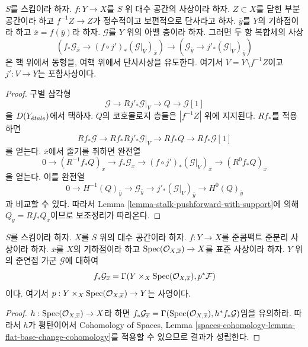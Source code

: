 \begin{lemma}
\label{lemma-stalk-formal-glueing}
$S$를 스킴이라 하자. $f : Y \to X$를 $S$ 위 대수 공간의 사상이라 하자.
$Z \subset X$를 닫힌 부분공간이라 하고 $f^{-1}Z \to Z$가 정수적이고
보편적으로 단사라고 하자. $\overline{y}$를 $Y$의 기하점이라 하고
$\overline{x} = f(\overline{y})$라 하자. $\mathcal{G}$를 $Y$ 위의
아벨 층이라 하자. 그러면 두 항 복합체의 사상
$$
\left(f_*\mathcal{G}_{\overline{x}} \to
(f \circ j')_*(\mathcal{G}|_V)_{\overline{x}}\right)
\longrightarrow
\left(\mathcal{G}_{\overline{y}} \to j'_*(\mathcal{G}|_V)_{\overline{y}}\right)
$$
은 핵 위에서 동형을, 여핵 위에서 단사사상을 유도한다. 여기서
$V = Y \setminus f^{-1}Z$이고 $j' : V \to Y$는 포함사상이다.
\end{lemma}

\begin{proof}
구별 삼각형
$$
\mathcal{G} \to Rj'_*\mathcal{G}|_V \to Q \to \mathcal{G}[1]
$$
을 $D(Y_{\acute{e}tale})$에서 택하자. $Q$의 코호몰로지 층들은
$|f^{-1}Z|$ 위에 지지된다. $Rf_*$를 적용하면
$$
Rf_*\mathcal{G} \to Rf_*Rj'_*\mathcal{G}|_V \to Rf_*Q
\to Rf_*\mathcal{G}[1]
$$
를 얻는다. $\overline{x}$에서 줄기를 취하면 완전열
$$
0 \to
(R^{-1}f_*Q)_{\overline{x}} \to
f_*\mathcal{G}_{\overline{x}} \to
(f \circ j')_*(\mathcal{G}|_V)_{\overline{x}} \to
(R^0f_*Q)_{\overline{x}}
$$
을 얻는다. 이를 완전열
$$
0 \to
H^{-1}(Q)_{\overline{y}} \to
\mathcal{G}_{\overline{y}} \to
j'_*(\mathcal{G}|_V)_{\overline{y}} \to
H^0(Q)_{\overline{y}}
$$
과 비교할 수 있다. 따라서 Lemma
\ref{lemma-stalk-pushforward-with-support}에 의해
$Q_{\overline{y}} = Rf_*Q_{\overline{x}}$이므로 보조정리가 따라온다.
\end{proof}

\begin{lemma}
\label{lemma-stalk-of-pushforward}
$S$를 스킴이라 하자. $X$를 $S$ 위의 대수 공간이라 하자.
$f : Y \to X$를 준콤팩트 준분리 사상이라 하자.
$\overline{x}$를 $X$의 기하점이라 하고
$\mathop{\mathrm{Spec}}(\mathcal{O}_{X, \overline{x}}) \to X$를 표준 사상이라 하자.
$Y$ 위의 준연접 가군 $\mathcal{G}$에 대하여
$$
f_*\mathcal{G}_{\overline{x}} =
\Gamma(Y \times_X \mathop{\mathrm{Spec}}(\mathcal{O}_{X, \overline{x}}), p^*\mathcal{F})
$$
이다. 여기서 $p : Y \times_X \mathop{\mathrm{Spec}}(\mathcal{O}_{X, \overline{x}}) \to Y$는
사영이다.
\end{lemma}

\begin{proof}
$h : \mathop{\mathrm{Spec}}(\mathcal{O}_{X, \overline{x}}) \to X$라 하면
$f_*\mathcal{G}_{\overline{x}} =
\Gamma(\mathop{\mathrm{Spec}}(\mathcal{O}_{X, \overline{x}}), h^*f_*\mathcal{G})$임을
유의하라. 따라서 $h$가 평탄이어서 Cohomology of Spaces, Lemma
\ref{spaces-cohomology-lemma-flat-base-change-cohomology}를 적용할 수 있으므로
결과가 성립한다.
\end{proof}

